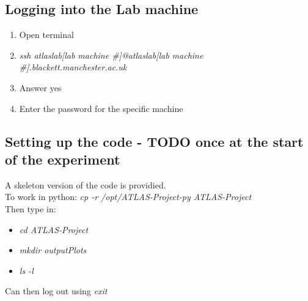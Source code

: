 \subsection{Logging into the Lab machine}
\begin{enumerate}
    \item Open terminal
    \item \it{ssh atlaslab[lab machine \#]@atlaslab[lab machine \#].blackett.manchester.ac.uk}
    \item Answer yes
    \item Enter the password for the specific machine
\end{enumerate}

\subsection{Setting up the code - TODO once at the start of the experiment}\label{subsec:setting-up-the-code}
A skeleton version of the code is providied.\\
To work in python: \textit{cp -r /opt/ATLAS-Project-py ATLAS-Project}\\
Then type in:\\
\begin{itemize}
    \item \textit{cd ATLAS-Project}
    \item \textit{mkdir outputPlots}
    \item \textit{ls -l}
\end{itemize}
Can then log out using \textit{exit}


